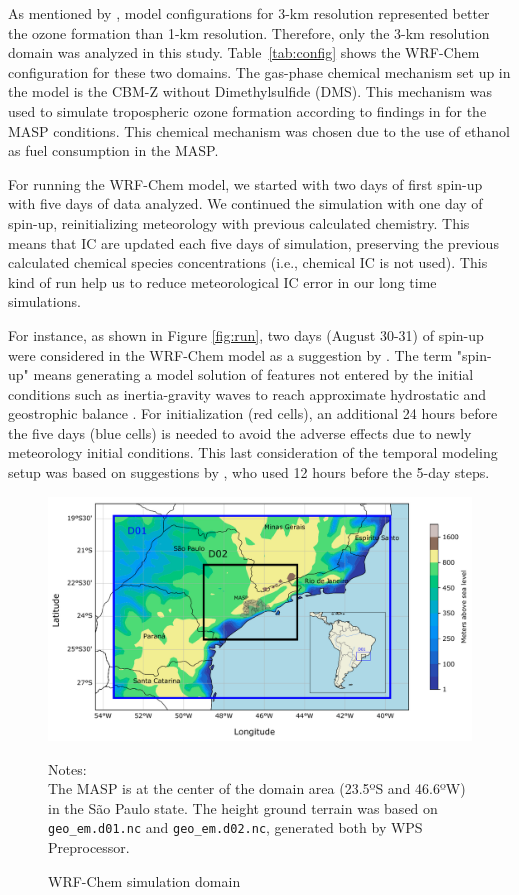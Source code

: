 As mentioned by \citet{Vara2013}, model configurations for 3-km resolution represented better the ozone formation than 1-km resolution.
Therefore, only the 3-km resolution domain was analyzed in this study.
Table~\ref{tab:config} shows the WRF-Chem configuration for these two domains.
The gas-phase chemical mechanism set up in the model is the CBM-Z \citep{Zaveri1999} without Dimethylsulfide (DMS). 
This mechanism was used to simulate tropospheric ozone formation according to findings in \citet{Andrade2015, Gavidia2018} for the MASP conditions. 
This chemical mechanism was chosen due to the use of ethanol as fuel consumption in the MASP.

For running the WRF-Chem model, we started with two days of first spin-up with five days of data analyzed.
We continued the simulation with one day of spin-up, reinitializing meteorology with previous calculated chemistry.
This means that IC are updated each five days of simulation, preserving the previous calculated chemical species concentrations (i.e., chemical IC is not used).
This kind of run help us to reduce meteorological IC error in our long time simulations.

For instance, as shown in Figure \ref{fig:run}, two days (August 30-31) of spin-up were considered in the WRF-Chem model as a suggestion by \citet{Warner2011}.
The term "spin-up" means generating a model solution of features not entered by the initial conditions such as inertia-gravity waves to reach approximate hydrostatic and geostrophic balance \citep{Warner2011}.
For initialization (red cells), an additional 24 hours before the five days (blue cells) is needed to avoid the adverse effects due to newly meteorology initial conditions.
This last consideration of the temporal modeling setup was based on suggestions by \citet{Ritter2013}, who used 12 hours before the 5-day steps.

\newpage

	
\begin{figure}[htbp]
  \includegraphics[width=1\textwidth]{fig/Domain.pdf} %
  \caption{WRF-Chem simulation domain}
  {\scriptsize Notes: \\ The MASP is at the center of the domain area (23.5ºS and 46.6ºW) in the São Paulo state. The height ground terrain was based on \verb|geo_em.d01.nc| and \verb|geo_em.d02.nc|, generated both by WPS Preprocessor.}
  \label{fig:domain_area}
\end{figure}


